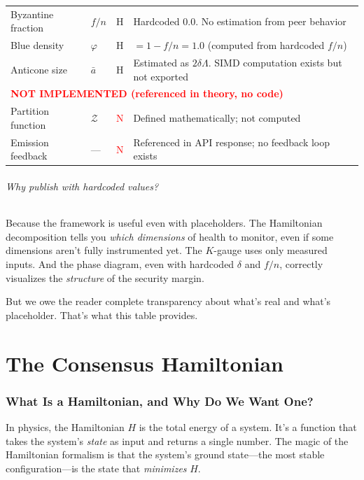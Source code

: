 \documentclass[11pt,a4paper]{article}
\begin{document}
\begin{table}[H]
\begin{tabular}{@{}p{3.5cm}lcp{5cm}@{}}
Byzantine fraction & $f/n$ & \textcolor{hardcoded}{H} & Hardcoded 0.0. No estimation from peer behavior \\
Blue density & $\varphi$ & \textcolor{hardcoded}{H} & $= 1 - f/n = 1.0$ (computed from hardcoded $f/n$) \\
Anticone size & $\bar{a}$ & \textcolor{hardcoded}{H} & Estimated as $2\delta\Lambda$. SIMD computation exists but not exported \\
\midrule
\multicolumn{4}{l}{\textbf{\textcolor{red}{NOT IMPLEMENTED (referenced in theory, no code)}}} \\
\midrule
Partition function & $\mathcal{Z}$ & \textcolor{red}{N} & Defined mathematically; not computed \\
Emission feedback & --- & \textcolor{red}{N} & Referenced in API response; no feedback loop exists \\
\bottomrule
\end{tabular}
\end{table}

\paragraph{Why publish with hardcoded values?} Because the framework is useful even with placeholders. The Hamiltonian decomposition tells you \emph{which dimensions} of health to monitor, even if some dimensions aren't fully instrumented yet. The $K$-gauge uses only measured inputs. And the phase diagram, even with hardcoded $\delta$ and $f/n$, correctly visualizes the \emph{structure} of the security margin.

But we owe the reader complete transparency about what's real and what's placeholder. That's what this table provides.

\part{The Consensus Hamiltonian}

\section{What Is a Hamiltonian, and Why Do We Want One?}

In physics, the Hamiltonian $H$ is the total energy of a system. It's a function that takes the system's \emph{state} as input and returns a single number. The magic of the Hamiltonian formalism is that the system's ground state---the most stable configuration---is the state that \emph{minimizes} $H$.
\end{document}
